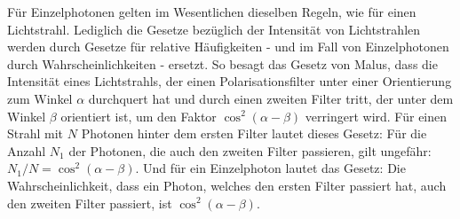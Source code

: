 F\"ur Einzelphotonen gelten im Wesentlichen dieselben Regeln, wie f\"ur einen Lichtstrahl. Lediglich
die Gesetze bez\"uglich der Intensit\"at von Lichtstrahlen werden durch Gesetze f\"ur relative H\"aufigkeiten
- und im Fall von Einzelphotonen durch Wahrscheinlichkeiten - ersetzt. So besagt das Gesetz
von Malus, dass die Intensit\"at eines Lichtstrahls, der einen Polarisationsfilter unter einer Orientierung
zum Winkel $\alpha$ durchquert hat und durch einen zweiten Filter tritt, der unter dem Winkel $\beta$ orientiert
ist, um den Faktor $\cos^2 (\alpha - \beta)$ verringert wird. F\"ur einen Strahl mit $N$ Photonen hinter dem
ersten Filter lautet dieses Gesetz: F\"ur die Anzahl $N_1$ der Photonen, die auch den zweiten Filter passieren, gilt
ungef\"ahr: $N_1/N = \cos^2(\alpha - \beta)$. Und f\"ur ein Einzelphoton lautet das Gesetz: Die Wahrscheinlichkeit,
dass ein Photon, welches den ersten Filter passiert hat, auch den zweiten Filter passiert, ist $\cos^2(\alpha - \beta)$. 

